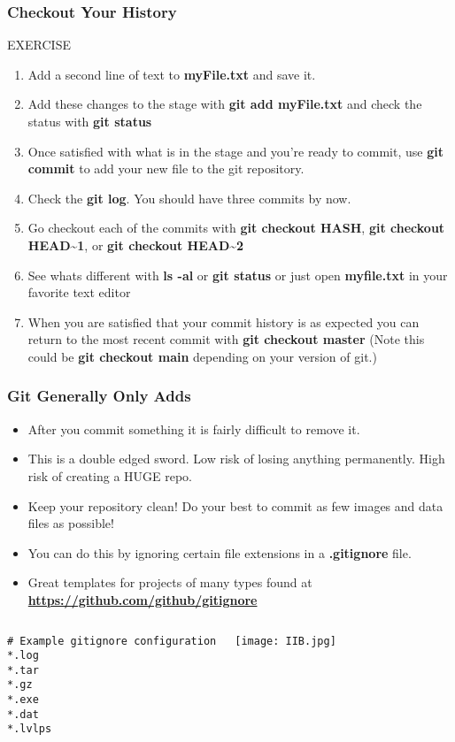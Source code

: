 \documentclass{beamer}
\begin{document}
\begin{frame}
\frametitle{Checkout Your History}
    \begin{block}{EXERCISE}
        \begin{enumerate}
	 \item Add a second line of text to \textbf{myFile.txt} and save it.
	 \item Add these changes to the stage with \textbf{git add myFile.txt} and check the status with \textbf{git status}
        \item Once satisfied with what is in the stage and you're ready to commit, use \textbf{git commit} to add your new file to the git repository.
        \item Check the \textbf{git log}. You should have three commits by now.
	 \item Go checkout each of the commits with \textbf{git checkout \textlangle{}HASH\textrangle{}}, \textbf{git checkout HEAD\textasciitilde1}, or \textbf{git checkout HEAD\textasciitilde2}
	 \item See whats different with \textbf{ls -al} or \textbf{git status} or just open \textbf{myfile.txt} in your favorite text editor
	 \item When you are satisfied that your commit history is as expected you can return to the most recent commit with \textbf{git checkout master} (Note this could be \textbf{git checkout main} depending on your version of git.)
        \end{enumerate}
    \end{block}
\end{frame}

\begin{frame}[fragile]
\frametitle{Git Generally Only Adds}

\begin{itemize}
\item After you commit something it is fairly difficult to remove it.
\item This is a double edged sword. Low risk of losing anything permanently. High risk of creating a HUGE repo. 
\item Keep your repository clean! Do your best to commit as few images and data files as possible!
\item You can do this by ignoring certain file extensions in a \textbf{.gitignore} file.
\item Great templates for projects of many types found at \textbf{\href{https://github.com/github/}{https://github.com/github/gitignore}}
\end{itemize}
\begin{columns}
\begin{lstlisting}
# Example gitignore configuration
*.log
*.tar
*.gz
*.exe
*.dat
*.lvlps
\end{lstlisting}
\texttt{[image: IIB.jpg]}
\end{columns}
\end{frame}
\end{document}
